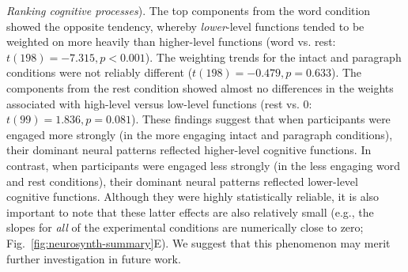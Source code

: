 \documentclass[english, 11pt]{article}
\begin{document}
\textit{Ranking cognitive processes}). The top components from the word
condition showed the opposite tendency, whereby \textit{lower}-level functions
tended to be weighted on more heavily than higher-level functions (word vs.
rest: $t(198) = -7.315, p < 0.001$). The weighting trends for the intact and
paragraph conditions were not reliably different ($t(198) = -0.479, p =
0.633$). The components from the rest condition showed almost no differences in
the weights associated with high-level versus low-level functions (rest vs. 0:
$t(99) = 1.836, p = 0.081$). These findings suggest that when participants were
engaged more strongly (in the more engaging intact and paragraph conditions),
their dominant neural patterns reflected higher-level cognitive functions. In
contrast, when participants were engaged less strongly (in the less engaging
word and rest conditions), their dominant neural patterns reflected lower-level
cognitive functions. Although they were highly statistically reliable, it is
also important to note that these latter effects are also relatively small
(e.g., the slopes for \textit{all} of the experimental conditions are
numerically close to zero; Fig.~\ref{fig:neurosynth-summary}E). We suggest that
this phenomenon may merit further investigation in future work. 
\end{document}
